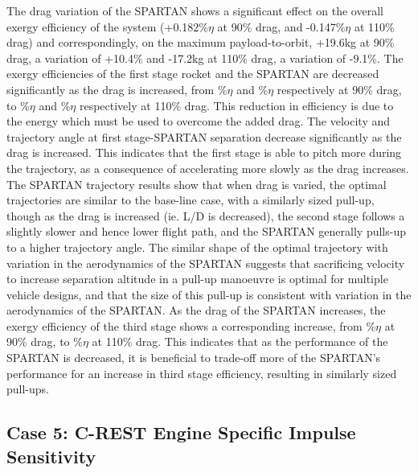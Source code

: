 The drag variation of the SPARTAN shows a significant effect on the overall exergy efficiency of the system (+0.182\%$\eta$ at 90\% drag, and -0.147\%$\eta$ at 110\% drag) and correspondingly, on the maximum payload-to-orbit, +19.6kg at 90\% drag, a variation of +10.4\% and -17.2kg at 110\% drag, a variation of -9.1\%. The exergy efficiencies of the first stage rocket and the SPARTAN are decreased significantly as the drag is increased, from \firstExergyEffCdNinetyNoReturn\%$\eta$ and \secondExergyEffCdNinetyNoReturn\%$\eta$ respectively at 90\% drag, to \firstExergyEffCdOneHundredTenNoReturn\%$\eta$ and \secondExergyEffCdOneHundredTenNoReturn\%$\eta$ respectively at 110\% drag. This reduction in efficiency is due to the energy which must be used to overcome the added drag. 
The velocity and trajectory angle at first stage-SPARTAN separation decrease significantly as the drag is increased. This indicates that the first stage is able to pitch more during the trajectory, as a consequence of accelerating more slowly as the drag increases.
The SPARTAN trajectory results show that when drag is varied, the optimal trajectories are similar to the base-line case, with a similarly sized pull-up, though as the drag is increased (ie. L/D is decreased), the second stage follows a slightly slower and hence lower flight path, and the SPARTAN generally pulls-up to a higher trajectory angle. The similar shape of the optimal trajectory with variation in the aerodynamics of the SPARTAN suggests that sacrificing velocity to increase separation altitude in a pull-up manoeuvre is optimal for multiple vehicle designs, and that the size of this pull-up is consistent with variation in the aerodynamics of the SPARTAN.
As the drag of the SPARTAN increases, the exergy efficiency of the third stage shows a corresponding increase, from \thirddExergyEffCdNinetyNoReturn\%$\eta$ at 90\% drag, to \thirddExergyEffCdOneHundredTenNoReturn\%$\eta$ at 110\% drag. This indicates that as the performance of the SPARTAN is decreased, it is beneficial to trade-off more of the SPARTAN's performance for an increase in third stage efficiency, resulting in similarly sized pull-ups. 


\subsection{Case 5: C-REST Engine Specific Impulse Sensitivity}\label{sec:ispsensitivitynoflyback}

